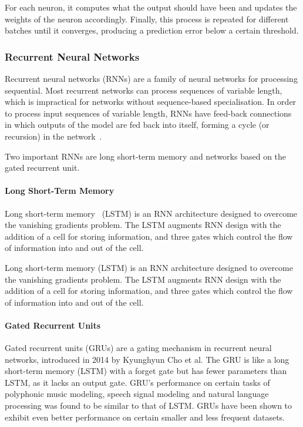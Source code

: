 For each neuron, it computes what the output should have been and updates the weights of the neuron accordingly.
Finally, this process is repeated for different batches until it converges, producing a prediction error below a certain threshold.

\subsubsection{Recurrent Neural Networks}

Recurrent neural networks (RNNs) are a family of neural networks for processing sequential.
Most recurrent networks can process sequences of variable length, which is impractical for networks without sequence-based specialisation.
In order to process input sequences of variable length, RNNs have feed-back connections in which outputs of the model are fed back into itself, forming a cycle (or recursion) in the network~\cite{goodfellow16}.

Two important RNNs are long short-term memory and networks based on the gated recurrent unit.

\paragraph{Long Short-Term Memory}

Long short-term memory~\cite{Graves12} (LSTM) is an RNN architecture designed to overcome the vanishing gradients problem.
The LSTM augments RNN design with the addition of a cell for storing information, and three gates which control the flow of information into and out of the cell.

Long short-term memory (LSTM) is an RNN architecture designed to overcome the vanishing gradients problem.
The LSTM augments RNN design with the addition of a cell for storing information, and three gates which control the flow of information into and out of the cell.

\paragraph{Gated Recurrent Units}

Gated recurrent units (GRUs) are a gating mechanism in recurrent neural networks, introduced in 2014 by Kyunghyun Cho et al. The GRU is like a long short-term memory (LSTM) with a forget gate but has fewer parameters than LSTM, as it lacks an output gate. GRU's performance on certain tasks of polyphonic music modeling, speech signal modeling and natural language processing was found to be similar to that of LSTM. GRUs have been shown to exhibit even better performance on certain smaller and less frequent datasets.

